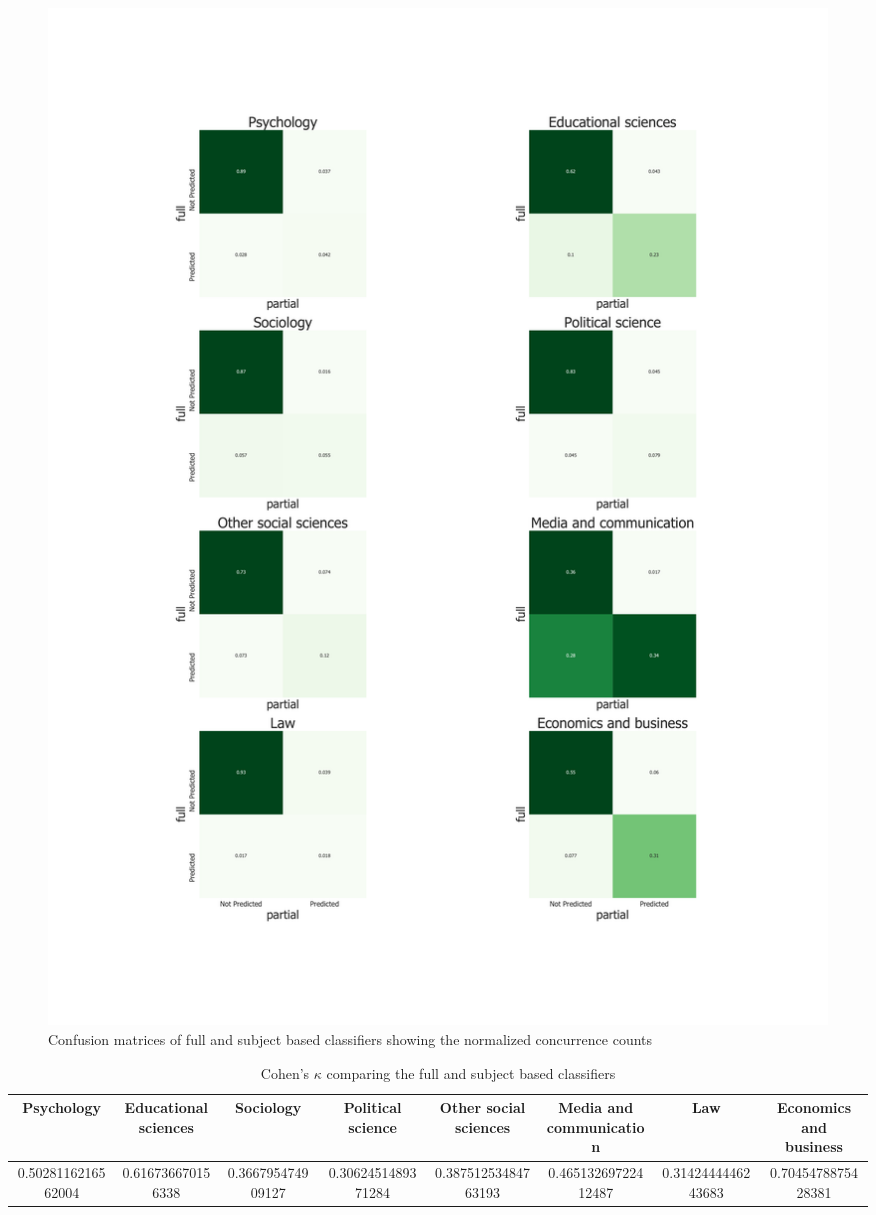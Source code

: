 \documentclass[12pt, a4paper]{article}
\begin{document}
\begin{figure}[H]
	\centering
	\begin{adjustbox}{center}
		\includegraphics[width=\textwidth]{full_vs_partial}
	\end{adjustbox}
	\caption{Confusion matrices of full and subject based classifiers showing the normalized concurrence counts}\label{full_vs_partial}
\end{figure}

\begin{table}[H]
	\centering
	\begin{adjustbox}{center}
	\begin{tabular}{cccccccc}
		\toprule
		Psychology & \pbox{20cm}{Educational\\sciences} & Sociology & \pbox{20cm}{Political\\science} & \pbox{20cm}{Other social\\sciences} & \pbox{20cm}{Media and\\communication} & Law & \pbox{20cm}{Economics and\\business}\\
		\midrule
		\num{0.5028116216562004} & \num{0.616736670156338} & \num{0.366795474909127} & \num{0.3062451489371284} & \num{0.38751253484763193} & \num{0.46513269722412487} & \num{0.3142444446243683} & \num{0.7045478875428381}\\
		\bottomrule
	\end{tabular}
\end{adjustbox}
\caption{Cohen's $\kappa$ comparing the full and subject based classifiers}\label{kappas}
\end{table}
\end{document}
